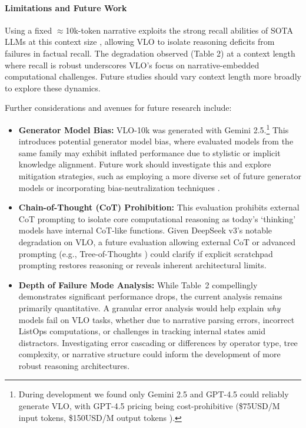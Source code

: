 \documentclass{article}
\begin{document}
\paragraph{Limitations and Future Work}
Using a fixed $\approx$10k-token narrative exploits the strong recall abilities of SOTA LLMs at this context size \citep{ContextArena2025}, allowing VLO to isolate reasoning deficits from failures in factual recall. The degradation observed (Table 2) at a context length where recall is robust underscores VLO's focus on narrative-embedded computational challenges. Future studies should vary context length more broadly to explore these dynamics.

Further considerations and avenues for future research include:

\begin{itemize}
  \item \textbf{Generator Model Bias:} VLO-10k was generated with Gemini 2.5.\footnote{During development we found only Gemini 2.5 and GPT-4.5 could reliably generate VLO, with GPT-4.5 pricing being cost-prohibitive (\$75USD/M input tokens, \$150USD/M output tokens \citep{openai_pricing_2025}).} This introduces potential generator model bias, where evaluated models from the same family may exhibit inflated performance due to stylistic or implicit knowledge alignment. Future work should investigate this and explore mitigation strategies, such as employing a more diverse set of future generator models or incorporating bias-neutralization techniques \citep{silencer}.
  \item \textbf{Chain-of-Thought (CoT) Prohibition:} This evaluation prohibits external CoT prompting to isolate core computational reasoning as today's `thinking' models have internal CoT-like functions. Given DeepSeek v3's notable degradation on VLO, a future evaluation allowing external CoT or advanced prompting (e.g., Tree-of-Thoughts \cite{treeofthoughts}) could clarify if explicit scratchpad prompting restores reasoning or reveals inherent architectural limits.
  \item \textbf{Depth of Failure Mode Analysis:} While Table~2 compellingly demonstrates significant performance drops, the current analysis remains primarily quantitative. A granular error analysis would help explain \textit{why} models fail on VLO tasks, whether due to narrative parsing errors, incorrect ListOps computations, or challenges in tracking internal states amid distractors. Investigating error cascading or differences by operator type, tree complexity, or narrative structure could inform the development of more robust reasoning architectures.

\end{itemize}
\end{document}
